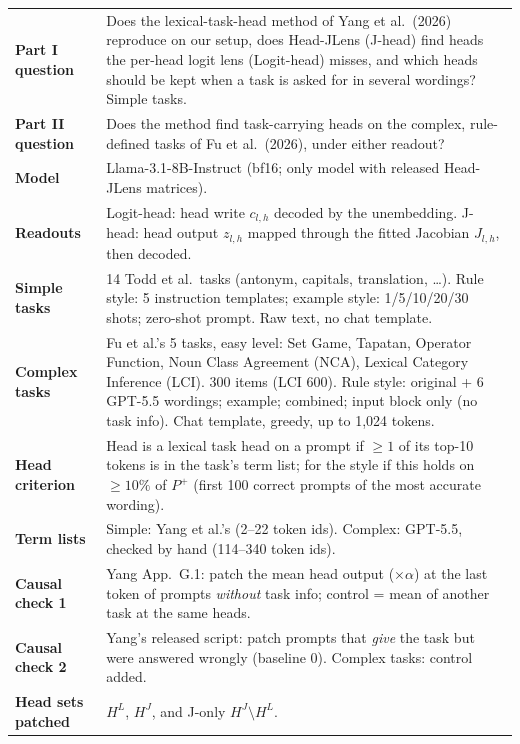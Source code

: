 \documentclass[10pt,a4paper]{article}
\begin{document}
\begin{tabularx}{\textwidth}{@{}>{\raggedright\arraybackslash\bfseries}p{2.8cm}L@{}}
\toprule
Part I question & Does the lexical-task-head method of Yang et al.\ (2026) reproduce on our setup, does Head-JLens (J-head) find heads the per-head logit lens (Logit-head) misses, and which heads should be kept when a task is asked for in several wordings? Simple tasks. \\
Part II question & Does the method find task-carrying heads on the complex, rule-defined tasks of Fu et al.\ (2026), under either readout? \\
Model & Llama-3.1-8B-Instruct (bf16; only model with released Head-JLens matrices). \\
Readouts & Logit-head: head write $c_{l,h}$ decoded by the unembedding. J-head: head output $z_{l,h}$ mapped through the fitted Jacobian $J_{l,h}$, then decoded. \\
Simple tasks & 14 Todd et al.\ tasks (antonym, capitals, translation, \dots). Rule style: 5 instruction templates; example style: 1/5/10/20/30 shots; zero-shot prompt. Raw text, no chat template. \\
Complex tasks & Fu et al.'s 5 tasks, easy level: Set Game, Tapatan, Operator Function, Noun Class Agreement (NCA), Lexical Category Inference (LCI). 300 items (LCI 600). Rule style: original + 6 GPT-5.5 wordings; example; combined; input block only (no task info). Chat template, greedy, up to 1,024 tokens. \\
Head criterion & Head is a lexical task head on a prompt if $\geq 1$ of its top-10 tokens is in the task's term list; for the style if this holds on $\geq 10\%$ of $P^+$ (first 100 correct prompts of the most accurate wording). \\
Term lists & Simple: Yang et al.'s (2--22 token ids). Complex: GPT-5.5, checked by hand (114--340 token ids). \\
Causal check 1 & Yang App.~G.1: patch the mean head output ($\times\alpha$) at the last token of prompts \emph{without} task info; control = mean of another task at the same heads. \\
Causal check 2 & Yang's released script: patch prompts that \emph{give} the task but were answered wrongly (baseline 0). Complex tasks: control added. \\
Head sets patched & $H^L$, $H^J$, and J-only $H^J\setminus H^L$. \\
\bottomrule
\end{tabularx}
\end{document}
